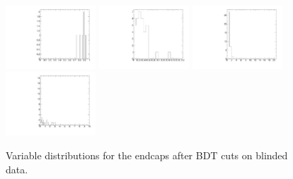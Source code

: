\begin{figure}
  \includegraphics[width=0.3\textwidth]{Figures/AfterBDTCut_iso_Endcaps.pdf}
  \includegraphics[width=0.3\textwidth]{Figures/AfterBDTCut_docatrk_Endcaps.pdf}
  \includegraphics[width=0.3\textwidth]{Figures/AfterBDTCut_closetrk_Endcaps.pdf}
  \includegraphics[width=0.3\textwidth]{Figures/AfterBDTCut_chi2dof_Endcaps.pdf}
  \caption{Variable distributions for the endcaps after BDT cuts on blinded data.}
  \label{fig:massPlotUnblinded}
\end{figure}

